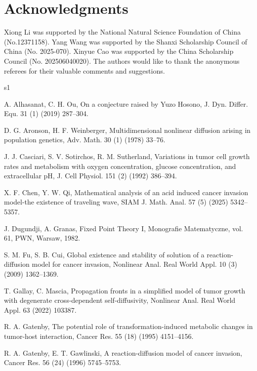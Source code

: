 \documentclass[preprint,sort&compress,final,12pt]{elsarticle}
\numberwithin{equation}{section}
\begin{document}
\section*{Acknowledgments}
Xiong Li was supported by the National Natural Science Foundation of China (No.12371158). Yang Wang was supported by the Shanxi Scholarship Council of China (No. 2025-070). Xinyue Cao was supported by the China Scholarship Council (No. 202506040020). The authors would like to thank the anonymous referees for their valuable comments and suggestions.



\begin{thebibliography}{s1}
	
A. Alhasanat, C. H. Ou, On a conjecture raised by Yuzo Hosono, J. Dyn. Differ. Equ. 31 (1) (2019) 287--304.
	
D. G. Aronson, H. F. Weinberger, Multidimensional nonlinear diffusion arising in population genetics, Adv. Math. 30 (1) (1978) 33--76.

J. J. Casciari, S. V. Sotirchos, R. M. Sutherland, Variations in tumor cell growth rates and metabolism with oxygen concentration, glucose concentration, and extracellular pH, J. Cell Physiol. 151 (2) (1992) 386--394.

X. F. Chen, Y. W. Qi, Mathematical analysis of an acid induced cancer invasion model-the existence of traveling wave, SIAM J. Math. Anal. 57 (5) (2025) 5342--5357.

J. Dugundji, A. Granas, Fixed Point Theory I, Monografie Matematyczne, vol. 61, PWN, Warsaw, 1982.

S. M. Fu, S. B. Cui, Global existence and stability of solution of a reaction-diffusion model for cancer invasion, Nonlinear Anal. Real World Appl. 10 (3) (2009) 1362--1369.

T. Gallay, C. Mascia, Propagation fronts in a simplified model of tumor growth with degenerate cross-dependent self-diffusivity, Nonlinear Anal. Real World Appl. 63 (2022) 103387.

R. A. Gatenby, The potential role of transformation-induced metabolic changes in tumor-host interaction, Cancer Res. 55 (18) (1995) 4151--4156.

R. A. Gatenby, E. T. Gawlinski, A reaction-diffusion model of cancer invasion, Cancer Res. 56 (24) (1996) 5745--5753.


\end{thebibliography}
\end{document}
